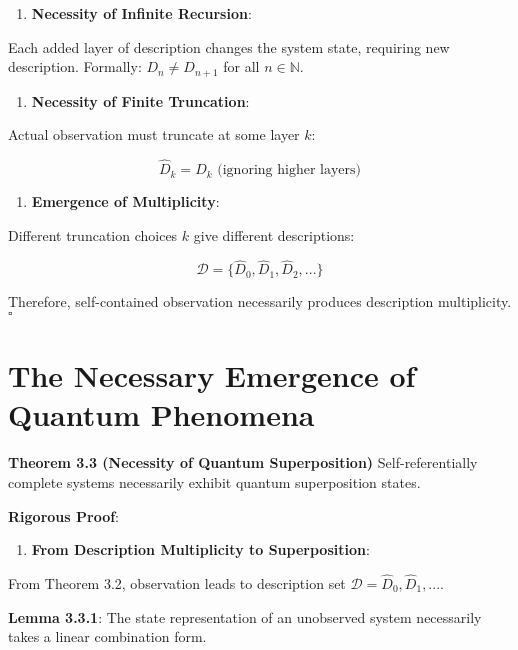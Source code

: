\begin{enumerate}
\item \textbf{Necessity of Infinite Recursion}:
\end{enumerate}
   Each added layer of description changes the system state, requiring new description.
   Formally: $D_n \neq D_{n+1}$ for all $n \in \mathbb{N}$.
   
\begin{enumerate}
\item \textbf{Necessity of Finite Truncation}:
\end{enumerate}
   Actual observation must truncate at some layer $k$:
   
\begin{equation}
\hat{D}_k = D_k \text{ (ignoring higher layers)}
\end{equation}

\begin{enumerate}
\item \textbf{Emergence of Multiplicity}:
\end{enumerate}
   Different truncation choices $k$ give different descriptions:
   
\begin{equation}
\mathcal{D} = \{\hat{D}_0, \hat{D}_1, \hat{D}_2, ...\}
\end{equation}

Therefore, self-contained observation necessarily produces description multiplicity. $\square$

\section{The Necessary Emergence of Quantum Phenomena}
\label{sec:ch03_quantum:the-necessary-emergence-of-quantum-phenomena}

\textbf{Theorem 3.3 (Necessity of Quantum Superposition)}
\label{thm:3.3}
Self-referentially complete systems necessarily exhibit quantum superposition states.

\textbf{Rigorous Proof}:

\begin{enumerate}
\item \textbf{From Description Multiplicity to Superposition}:
\end{enumerate}
   From Theorem 3.2, observation leads to description set $\mathcal{D} = {\hat{D}_0, \hat{D}_1, ...}$.
   
   \textbf{Lemma 3.3.1}: The state representation of an unobserved system necessarily takes a linear combination form.
\label{lemma:3.3.1}
   
